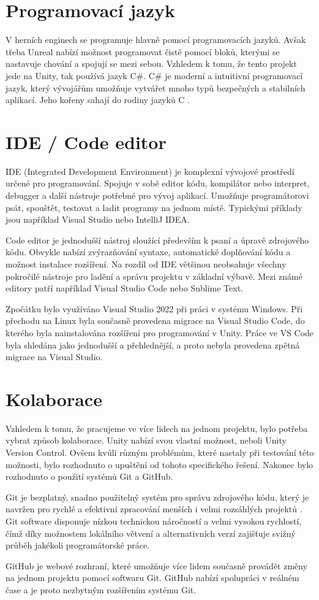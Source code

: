 \newpage
\section{Programovací jazyk}

V herních enginech se programuje hlavně pomocí programovacích jazyků. Avšak třeba Unreal nabízí možnost programovat čistě pomocí bloků, kterými se nastavuje chování a spojují se mezi sebou. Vzhledem k tomu, že tento projekt jede na Unity, tak používá jazyk C\#. C\# je moderní a intuitivní programovací jazyk, který vývojářům umožňuje vytvářet mnoho typů bezpečných a stabilních aplikací. Jeho kořeny sahají do rodiny jazyků C \cite{csharp-tour}.

\section{IDE / Code editor}

IDE (Integrated Development Environment) je komplexní vývojové prostředí určené pro programování. Spojuje v sobě editor kódu, kompilátor nebo interpret, debugger a další nástroje potřebné pro vývoj aplikací. Umožňuje programátorovi psát, spouštět, testovat a ladit programy na jednom místě. Typickými příklady jsou například Visual Studio nebo IntelliJ IDEA.

Code editor je jednodušší nástroj sloužící především k psaní a úpravě zdrojového kódu. Obvykle nabízí zvýrazňování syntaxe, automatické doplňování kódu a možnost instalace rozšíření. Na rozdíl od IDE většinou neobsahuje všechny pokročilé nástroje pro ladění a správu projektu v základní výbavě. Mezi známé editory patří například Visual Studio Code nebo Sublime Text.

Zpočátku bylo využíváno Visual Studio 2022 při práci v systému Windows. Při přechodu na Linux byla současně provedena migrace na Visual Studio Code, do kterého byla nainstalována rozšíření pro programování v Unity. Práce ve VS Code byla shledána jako jednodušší a přehlednější, a proto nebyla provedena zpětná migrace na Visual Studio.

\section{Kolaborace}

Vzhledem k tomu, že pracujeme ve více lidech na jednom projektu, bylo potřeba vybrat způsob kolaborace. Unity nabízí svou vlastní možnost, neboli Unity Version Control. Ovšem kvůli různým problémům, které nastaly při testování této možnosti, bylo rozhodnuto o upuštění od tohoto specifického řešení. Nakonec bylo rozhodnuto o použití systémů Git a GitHub.

Git je bezplatný, snadno použitelný systém pro správu zdrojového kódu, který je navržen pro rychlé a efektivní zpracování menších i velmi rozsáhlých projektů \cite{git}. Git software disponuje nízkou technickou náročností a velmi vysokou rychlostí, čímž díky možnostem lokálního větvení a alternativních verzí zajišťuje svižný průběh jakékoli programátorské práce.

GitHub je webové rozhraní, které umožňuje více lidem současně provádět změny na jednom projektu pomocí softwaru Git. GitHub nabízí spolupráci v reálném čase a je proto nezbytným rozšířením systému Git.
